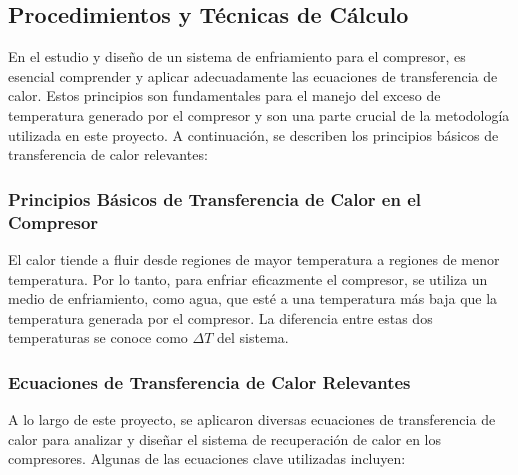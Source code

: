 \documentclass[11pt,a4paper]{article}  %
\begin{document}
\subsection{Procedimientos y Técnicas de Cálculo}

En el estudio y diseño de un sistema de enfriamiento para el compresor, es esencial comprender y aplicar adecuadamente las ecuaciones de transferencia de calor. Estos principios son fundamentales para el manejo del exceso de temperatura generado por el compresor y son una parte crucial de la metodología utilizada en este proyecto. A continuación, se describen los principios básicos de transferencia de calor relevantes:

\subsubsection{Principios Básicos de Transferencia de Calor en el Compresor}

El calor tiende a fluir desde regiones de mayor temperatura a regiones de menor temperatura. Por lo tanto, para enfriar eficazmente el compresor, se utiliza un medio de enfriamiento, como agua, que esté a una temperatura más baja que la temperatura generada por el compresor. La diferencia entre estas dos temperaturas se conoce como $\Delta T$ del sistema.

\subsubsection{Ecuaciones de Transferencia de Calor Relevantes}

A lo largo de este proyecto, se aplicaron diversas ecuaciones de transferencia de calor para analizar y diseñar el sistema de recuperación de calor en los compresores. Algunas de las ecuaciones clave utilizadas incluyen:
\end{document}
